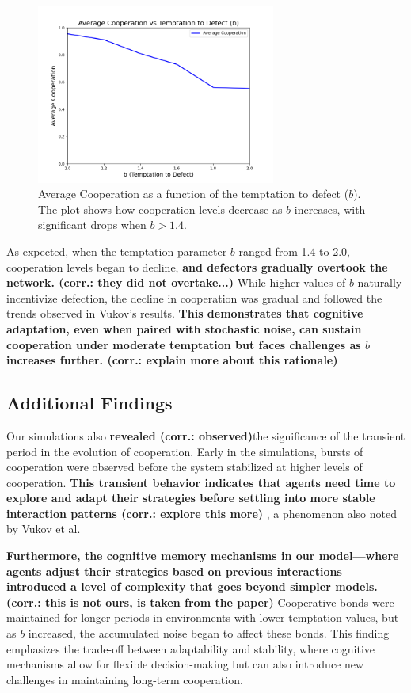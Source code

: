 \documentclass[runningheads]{llncs}
\begin{document}
\begin{figure}[htbp]
    \centering
    \includegraphics[width=0.7\textwidth]{cooperation_vs_b.png}
    \caption{Average Cooperation as a function of the temptation to defect (\( b \)). The plot shows how cooperation levels decrease as \( b \) increases, with significant drops when \( b > 1.4 \).}
    \label{fig:coop_vs_b}
\end{figure}

As expected, when the temptation parameter \( b \) ranged from 1.4 to 2.0, cooperation levels began to decline, \textbf{and defectors gradually overtook the network. (corr.: they did not overtake...)} While higher values of \( b \) naturally incentivize defection, the decline in cooperation was gradual and followed the trends observed in Vukov's results. \textbf{This demonstrates that cognitive adaptation, even when paired with stochastic noise, can sustain cooperation under moderate temptation but faces challenges as \( b \) increases further. (corr.: explain more about this rationale)}

\subsection{Additional Findings}
Our simulations also \textbf{revealed (corr.: observed)}the significance of the transient period in the evolution of cooperation. Early in the simulations, bursts of cooperation were observed before the system stabilized at higher levels of cooperation. \textbf{This transient behavior indicates that agents need time to explore and adapt their strategies before settling into more stable interaction patterns (corr.: explore this more)} , a phenomenon also noted by Vukov et al.

\textbf{Furthermore, the cognitive memory mechanisms in our model—where agents adjust their strategies based on previous interactions—introduced a level of complexity that goes beyond simpler models. (corr.: this is not ours, is taken from the paper)}  Cooperative bonds were maintained for longer periods in environments with lower temptation values, but as \( b \) increased, the accumulated noise began to affect these bonds. This finding emphasizes the trade-off between adaptability and stability, where cognitive mechanisms allow for flexible decision-making but can also introduce new challenges in maintaining long-term cooperation.
\end{document}
